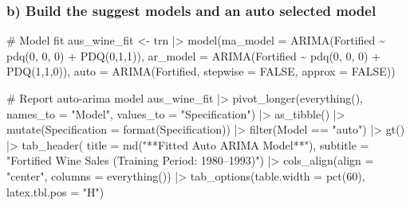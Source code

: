 \documentclass[
  letterpaper,
  DIV=11,
  numbers=noendperiod]{scrartcl}
\newenvironment{Shaded}{\begin{snugshade}}{\end{snugshade}}
\newcommand{\AttributeTok}[1]{\textcolor[rgb]{0.40,0.45,0.13}{#1}}
\newcommand{\CommentTok}[1]{\textcolor[rgb]{0.37,0.37,0.37}{#1}}
\newcommand{\ConstantTok}[1]{\textcolor[rgb]{0.56,0.35,0.01}{#1}}
\newcommand{\DecValTok}[1]{\textcolor[rgb]{0.68,0.00,0.00}{#1}}
\newcommand{\FunctionTok}[1]{\textcolor[rgb]{0.28,0.35,0.67}{#1}}
\newcommand{\NormalTok}[1]{\textcolor[rgb]{0.00,0.23,0.31}{#1}}
\newcommand{\OtherTok}[1]{\textcolor[rgb]{0.00,0.23,0.31}{#1}}
\newcommand{\SpecialCharTok}[1]{\textcolor[rgb]{0.37,0.37,0.37}{#1}}
\newcommand{\StringTok}[1]{\textcolor[rgb]{0.13,0.47,0.30}{#1}}
\begin{document}
\newpage

\subsubsection{b) Build the suggest models and an auto selected
model}\label{b-build-the-suggest-models-and-an-auto-selected-model}

\begin{Shaded}
\begin{Highlighting}[]
\CommentTok{\# Model fit}
\NormalTok{aus\_wine\_fit }\OtherTok{\textless{}{-}}\NormalTok{ trn }\SpecialCharTok{|\textgreater{}}
  \FunctionTok{model}\NormalTok{(}\AttributeTok{ma\_model =} \FunctionTok{ARIMA}\NormalTok{(Fortified }\SpecialCharTok{\textasciitilde{}} \FunctionTok{pdq}\NormalTok{(}\DecValTok{0}\NormalTok{, }\DecValTok{0}\NormalTok{, }\DecValTok{0}\NormalTok{) }\SpecialCharTok{+} \FunctionTok{PDQ}\NormalTok{(}\DecValTok{0}\NormalTok{,}\DecValTok{1}\NormalTok{,}\DecValTok{1}\NormalTok{)),}
        \AttributeTok{ar\_model =} \FunctionTok{ARIMA}\NormalTok{(Fortified }\SpecialCharTok{\textasciitilde{}} \FunctionTok{pdq}\NormalTok{(}\DecValTok{0}\NormalTok{, }\DecValTok{0}\NormalTok{, }\DecValTok{0}\NormalTok{) }\SpecialCharTok{+} \FunctionTok{PDQ}\NormalTok{(}\DecValTok{1}\NormalTok{,}\DecValTok{1}\NormalTok{,}\DecValTok{0}\NormalTok{)),}
        \AttributeTok{auto =} \FunctionTok{ARIMA}\NormalTok{(Fortified, }\AttributeTok{stepwise =} \ConstantTok{FALSE}\NormalTok{, }\AttributeTok{approx =} \ConstantTok{FALSE}\NormalTok{))}

\CommentTok{\# Report auto{-}arima model}
\NormalTok{aus\_wine\_fit }\SpecialCharTok{|\textgreater{}}
  \FunctionTok{pivot\_longer}\NormalTok{(}\FunctionTok{everything}\NormalTok{(), }\AttributeTok{names\_to =} \StringTok{"Model"}\NormalTok{, }\AttributeTok{values\_to =} \StringTok{"Specification"}\NormalTok{) }\SpecialCharTok{|\textgreater{}}
  \FunctionTok{as\_tibble}\NormalTok{() }\SpecialCharTok{|\textgreater{}}
  \FunctionTok{mutate}\NormalTok{(}\AttributeTok{Specification =} \FunctionTok{format}\NormalTok{(Specification)) }\SpecialCharTok{|\textgreater{}}
  \FunctionTok{filter}\NormalTok{(Model }\SpecialCharTok{==} \StringTok{"auto"}\NormalTok{) }\SpecialCharTok{|\textgreater{}}
  \FunctionTok{gt}\NormalTok{() }\SpecialCharTok{|\textgreater{}}
  \FunctionTok{tab\_header}\NormalTok{(}
    \AttributeTok{title =} \FunctionTok{md}\NormalTok{(}\StringTok{"**Fitted Auto ARIMA Model**"}\NormalTok{),}
    \AttributeTok{subtitle =} \StringTok{"Fortified Wine Sales (Training Period: 1980–1993)"}\NormalTok{) }\SpecialCharTok{|\textgreater{}}
  \FunctionTok{cols\_align}\NormalTok{(}\AttributeTok{align =} \StringTok{"center"}\NormalTok{, }\AttributeTok{columns =} \FunctionTok{everything}\NormalTok{()) }\SpecialCharTok{|\textgreater{}}
  \FunctionTok{tab\_options}\NormalTok{(}\AttributeTok{table.width =} \FunctionTok{pct}\NormalTok{(}\DecValTok{60}\NormalTok{), }\AttributeTok{latex.tbl.pos =} \StringTok{"H"}\NormalTok{)}
\end{Highlighting}
\end{Shaded}
\end{document}
